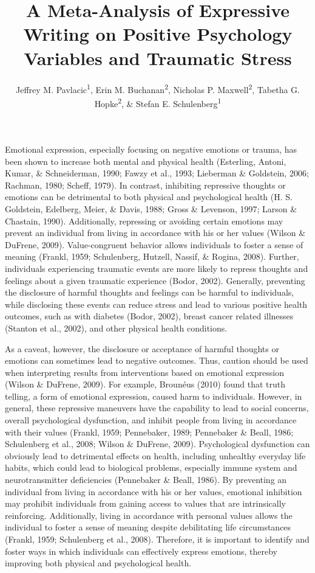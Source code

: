 \documentclass[english,man]{apa6}
\title{A Meta-Analysis of Expressive Writing on Positive Psychology Variables
and Traumatic Stress}
\author{Jeffrey M. Pavlacic\textsuperscript{1}, Erin M. Buchanan\textsuperscript{2}, Nicholas P. Maxwell\textsuperscript{2}, Tabetha G. Hopke\textsuperscript{2}, \& Stefan E. Schulenberg\textsuperscript{1}}
\affiliation{
    \vspace{0.5cm}
          \textsuperscript{1} University of Mississippi\\
          \textsuperscript{2} Missouri State University  }
\theoremstyle{definition}
\theoremstyle{definition}
\theoremstyle{definition}
\theoremstyle{remark}
\begin{document}
\maketitle

\setcounter{secnumdepth}{0}



Emotional expression, especially focusing on negative emotions or
trauma, has been shown to increase both mental and physical health
(Esterling, Antoni, Kumar, \& Schneiderman, 1990; Fawzy et al., 1993;
Lieberman \& Goldstein, 2006; Rachman, 1980; Scheff, 1979). In contrast,
inhibiting repressive thoughts or emotions can be detrimental to both
physical and psychological health (H. S. Goldstein, Edelberg, Meier, \&
Davis, 1988; Gross \& Levenson, 1997; Larson \& Chastain, 1990).
Additionally, repressing or avoiding certain emotions may prevent an
individual from living in accordance with his or her values (Wilson \&
DuFrene, 2009). Value-congruent behavior allows individuals to foster a
sense of meaning (Frankl, 1959; Schulenberg, Hutzell, Nassif, \& Rogina,
2008). Further, individuals experiencing traumatic events are more
likely to repress thoughts and feelings about a given traumatic
experience (Bodor, 2002). Generally, preventing the disclosure of
harmful thoughts and feelings can be harmful to individuals, while
disclosing these events can reduce stress and lead to various positive
health outcomes, such as with diabetes (Bodor, 2002), breast cancer
related illnesses (Stanton et al., 2002), and other physical health
conditions.

As a caveat, however, the disclosure or acceptance of harmful thoughts
or emotions can sometimes lead to negative outcomes. Thus, caution
should be used when interpreting results from interventions based on
emotional expression (Wilson \& DuFrene, 2009). For example, Brounéus
(2010) found that truth telling, a form of emotional expression, caused
harm to individuals. However, in general, these repressive maneuvers
have the capability to lead to social concerns, overall psychological
dysfunction, and inhibit people from living in accordance with their
values (Frankl, 1959; Pennebaker, 1989; Pennebaker \& Beall, 1986;
Schulenberg et al., 2008; Wilson \& DuFrene, 2009). Psychological
dysfunction can obviously lead to detrimental effects on health,
including unhealthy everyday life habits, which could lead to biological
problems, especially immune system and neurotransmitter deficiencies
(Pennebaker \& Beall, 1986). By preventing an individual from living in
accordance with his or her values, emotional inhibition may prohibit
individuals from gaining access to values that are intrinsically
reinforcing. Additionally, living in accordance with personal values
allows the individual to foster a sense of meaning despite debilitating
life circumstances (Frankl, 1959; Schulenberg et al., 2008). Therefore,
it is important to identify and foster ways in which individuals can
effectively express emotions, thereby improving both physical and
psychological health.
\end{document}
